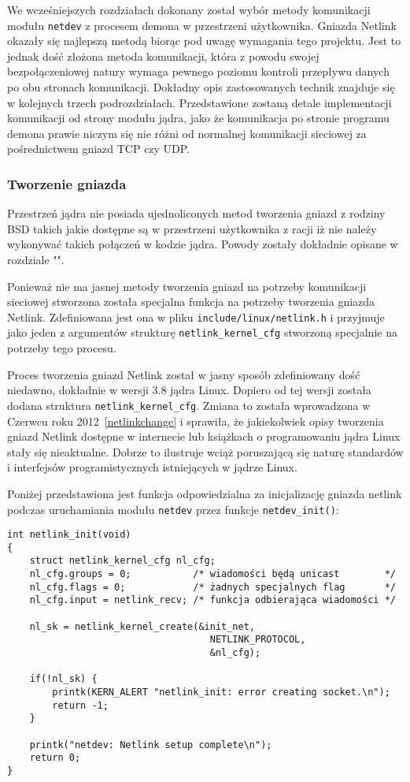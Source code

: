\documentclass[10pt]{article}
\begin{document}
We wcześniejszych rozdziałach dokonany został wybór metody komunikacji modułu \texttt{netdev} z procesem demona w przestrzeni użytkownika.  Gniazda Netlink okazały się najlepszą metodą biorąc pod uwagę wymagania tego projektu. Jest to jednak dość złożona metoda komunikacji, która z powodu swojej bezpołączeniowej natury wymaga pewnego poziomu kontroli przepływu danych po obu stronach komunikacji. Dokładny opis zastosowanych technik znajduje się w kolejnych trzech podrozdziałach.  Przedstawione zostaną detale implementacji komunikacji od strony modułu jądra, jako że komunikacja po stronie programu demona prawie niczym się nie różni od normalnej komunikacji sieciowej za pośrednictwem gniazd TCP czy UDP.

\subsubsection{Tworzenie gniazda}
\label{sockcreate}

Przestrzeń jądra nie posiada ujednoliconych metod tworzenia gniazd z rodziny BSD takich jakie dostępne są w przestrzeni użytkownika z racji iż nie należy wykonywać takich połączeń w kodzie jądra. Powody zostały dokładnie opisane w rozdziale "".

Ponieważ nie ma jasnej metody tworzenia gniazd na potrzeby komunikacji sieciowej stworzona została specjalna funkcja na potrzeby tworzenia gniazda Netlink. Zdefiniowana jest ona w pliku \texttt{include/linux/netlink.h} i przyjmuje jako jeden z argumentów strukturę \texttt{netlink\_kernel\_cfg} stworzoną specjalnie na potrzeby tego procesu.

Proces tworzenia gniazd Netlink został w jasny sposób zdefiniowany dość niedawno, dokładnie w wersji 3.8 jądra Linux. Dopiero od tej wersji została dodana struktura \texttt{netlink\_kernel\_cfg}. Zmiana to została wprowadzona w Czerwcu roku 2012~\ref{netlinkchange} i sprawiła, że jakiekolwiek opisy tworzenia gniazd Netlink dostępne w internecie lub książkach o programowaniu jądra Linux stały się nieaktualne. Dobrze to ilustruje wciąż poruszającą się naturę standardów i interfejsów programistycznych istniejących w jądrze Linux.

Poniżej przedstawiona jest funkcja odpowiedzialna za inicjalizację gniazda netlink podczas uruchamiania modułu \texttt{netdev} przez funkcje \texttt{netdev\_init()}:

\begin{verbatim}
int netlink_init(void)
{
    struct netlink_kernel_cfg nl_cfg;
    nl_cfg.groups = 0;           /* wiadomości będą unicast        */
    nl_cfg.flags = 0;            /* żadnych specjalnych flag       */
    nl_cfg.input = netlink_recv; /* funkcja odbierająca wiadomości */

    nl_sk = netlink_kernel_create(&init_net,
                                    NETLINK_PROTOCOL,
                                    &nl_cfg);

    if(!nl_sk) {
        printk(KERN_ALERT "netlink_init: error creating socket.\n");
        return -1;
    }

    printk("netdev: Netlink setup complete\n");
    return 0;
}
\end{verbatim}
\end{document}
